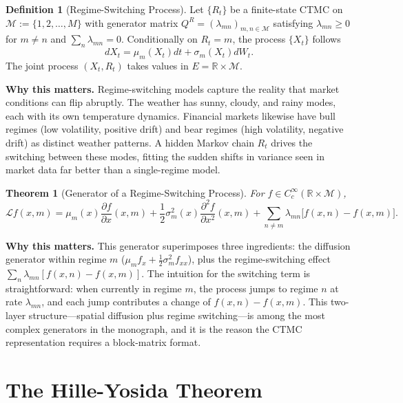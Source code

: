 \documentclass[11pt,a4paper,openany]{book}
\theoremstyle{definition}
\newtheorem{definition}{Definition}[chapter]
\theoremstyle{plain}
\newtheorem{theorem}{Theorem}[chapter]
\theoremstyle{remark}
\newcommand{\1}{\mathbbm{1}}
\newcommand{\R}{\mathbb{R}}
\newcommand{\M}{\mathcal{M}}
\newcommand{\calL}{\mathcal{L}}
\begin{document}
\begin{definition}[Regime-Switching Process]
Let $\{R_{t}\}$ be a finite-state CTMC on $\M := \{1, 2, \ldots, M\}$ with generator matrix $Q^{R} = (\lambda_{mn})_{m,n \in \M}$ satisfying $\lambda_{mn} \geq 0$ for $m \neq n$ and $\sum_{n} \lambda_{mn} = 0$. Conditionally on $R_{t} = m$, the process $\{X_{t}\}$ follows
\[
dX_{t} = \mu_{m}(X_{t}) dt + \sigma_{m}(X_{t}) dW_{t}.
\]
The joint process $(X_{t}, R_{t})$ takes values in $E = \R \times \M$.
\end{definition}

\medskip
\noindent\textbf{Why this matters.} Regime-switching models capture the reality that market conditions can flip abruptly. The weather has sunny, cloudy, and rainy modes, each with its own temperature dynamics. Financial markets likewise have bull regimes (low volatility, positive drift) and bear regimes (high volatility, negative drift) as distinct weather patterns. A hidden Markov chain $R_t$ drives the switching between these modes, fitting the sudden shifts in variance seen in market data far better than a single-regime model.

\begin{theorem}[Generator of a Regime-Switching Process]
For $f \in C_{c}^{\infty}(\R \times \M)$,
\[
\boxed{\calL f(x, m) = \mu_{m}(x) \frac{\partial f}{\partial x}(x, m) + \frac{1}{2} \sigma_{m}^{2}(x) \frac{\partial^{2} f}{\partial x^{2}}(x, m) + \sum_{n \neq m} \lambda_{mn} \big[f(x, n) - f(x, m)\big]}.
\]
\end{theorem}

\medskip
\noindent\textbf{Why this matters.} This generator superimposes three ingredients: the diffusion generator within regime $m$ ($\mu_m f_x + \frac{1}{2}\sigma_m^2 f_{xx}$), plus the regime-switching effect $\sum_n \lambda_{mn}[f(x,n) - f(x,m)]$. The intuition for the switching term is straightforward: when currently in regime $m$, the process jumps to regime $n$ at rate $\lambda_{mn}$, and each jump contributes a change of $f(x,n) - f(x,m)$. This two-layer structure---spatial diffusion plus regime switching---is among the most complex generators in the monograph, and it is the reason the CTMC representation requires a block-matrix format.

\chapter{The Hille-Yosida Theorem}
\label{ch:hille-yosida}
\end{document}
